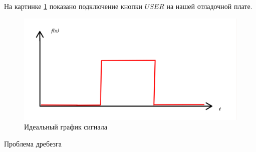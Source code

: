 На картинке \ref{drebezg} показано подключение кнопки $USER$ на нашей отладочной плате. 
	
	
\begin{figure}[h!]
		\centering
		\includegraphics[width=1\linewidth]{pics/ideal_sing.png}
		\caption{Идеальный график сигнала}
		\label{drebezg}
\end{figure}
	
Проблема дребезга 

